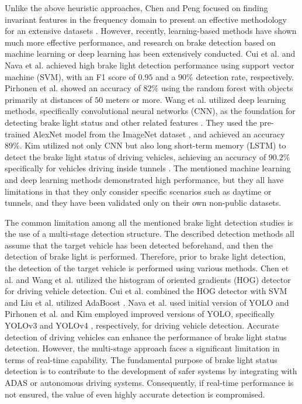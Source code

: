 Unlike the above heuristic approaches, Chen and Peng focused on finding invariant features in the frequency domain to present an effective methodology for an extensive datasets \cite{chen2012frequency}.
However, recently, learning-based methods have shown much more effective performance, and research on brake detection based on machine learning or deep learning has been extensively conducted.
Cui et al. \cite{cui2015vision} and Nava et al. \cite{nava2019collision} achieved high brake light detection performance using support vector machine (SVM), with an F1 score of $0.95$ and a $90\%$ detection rate, respectively. 
Pirhonen et al. \cite{pirhonen2022brake} showed an accuracy of $82\%$ using the random forest with objects primarily at distances of $50$ meters or more.
Wang et al. utilized deep learning methods, specifically convolutional neural networks (CNN), as the foundation for detecting brake light status and other related features \cite{wang2016appearance}.
They used the pre-trained AlexNet model \cite{krizhevsky2012imagenet} from the ImageNet dataset \cite{russakovsky2015imagenet}, and achieved an accuracy $89\%$.
Kim utilized not only CNN but also long short-term memory (LSTM) to detect the brake light status of driving vehicles, achieving an accuracy of $90.2\%$ specifically for vehicles driving inside tunnels \cite{kim2022detecting}.
The mentioned machine learning and deep learning methods demonstrated high performance, but they all have limitations in that they only consider specific scenarios such as daytime or tunnels, and they have been validated only on their own non-public datasets.

The common limitation among all the mentioned brake light detection studies is the use of a multi-stage detection structure.
The described detection methods all assume that the target vehicle has been detected beforehand, and then the detection of brake light is performed.
Therefore, prior to brake light detection, the detection of the target vehicle is performed using various methods.
Chen et al. \cite{chen2015daytime} and Wang et al. \cite{wang2016appearance} utilized the histogram of oriented gradients (HOG) detector for driving vehicle detection. 
Cui et al. \cite{cui2015vision} combined the HOG detector with SVM and Liu et al. \cite{liu2015vision} utilized AdaBoost \cite{freund1996experiments}. 
Nava et al. used initial version of YOLO \cite{redmon2016you,redmon2017yolo9000} and Pirhonen et al. \cite{pirhonen2022brake} and Kim \cite{kim2022detecting} employed improved versions of YOLO, specifically YOLOv3 \cite{redmon2018yolov3} and YOLOv4 \cite{bochkovskiy2020yolov4}, respectively, for driving vehicle detection.
Accurate detection of driving vehicles can enhance the performance of brake light status detection. 
However, the multi-stage approach faces a significant limitation in terms of real-time capability. 
The fundamental purpose of brake light status detection is to contribute to the development of safer systems by integrating with ADAS or autonomous driving systems. Consequently, if real-time performance is not ensured, the value of even highly accurate detection is compromised.

